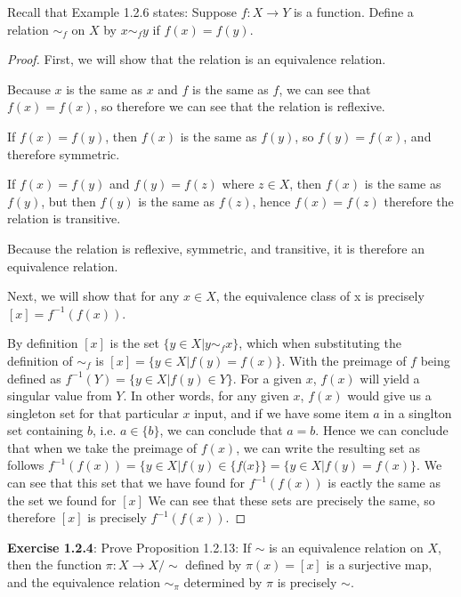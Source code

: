 \documentclass[a4paper]{article}
\begin{document}
\begin{myparindent}{0pt}
Recall that Example 1.2.6 states: Suppose $f : X \rightarrow Y$ is a function.
Define a relation $\sim_f$ on $X$ by $x \sim_f y$ if $f(x) = f(y)$.

\begin{proof}
    First, we will show that the relation is an equivalence relation. \newline

    Because $x$ is the same as $x$ and $f$ is the same as $f$, we can see that
    $f(x) = f(x)$, so therefore we can see that the relation is reflexive. \newline

    If $f(x) = f(y)$, then $f(x)$ is the same as $f(y)$, so $f(y) = f(x)$,
    and therefore symmetric. \newline

    If $f(x) = f(y)$ and $f(y) = f(z)$ where $z \in X$, then $f(x)$ is
    the same as $f(y)$, but then $f(y)$ is the same as $f(z)$, hence $f(x) = f(z)$
    therefore the relation is transitive. \newline

    Because the relation is reflexive, symmetric, and transitive, it
    is therefore an equivalence relation. \newline

    Next, we will show that for any $x \in X$, the equivalence class of x is
    precisely $[x] = f^{-1}(f(x))$. \newline

    By definition $[x]$ is the set $\{y \in X | y \sim_f x\}$, which when substituting
    the definition of $\sim_f$ is $[x] = \{y \in X | f(y) = f(x)\}$. With the preimage
    of $f$ being defined as $f^{-1}(Y) = \{ y \in X | f(y) \in Y \}$.
    For a given $x$, $f(x)$ will yield
    a singular value from $Y$. In other words, for any given $x$, $f(x)$
    would give us a singleton set for that particular $x$ input, and if we have
    some item $a$ in a singlton set containing $b$, i.e. $a \in \{b\}$, we can
    conclude that $a = b$. Hence we can conclude that when we take the preimage
    of $f(x)$, we can write the resulting set as follows
    $f^{-1}(f(x)) = \{ y \in X | f(y) \in \{f(x\} \} = \{ y \in X | f(y) = f(x) \}$. We can see
    that this set that we have found for $f^{-1}(f(x))$ is eactly the same
    as the set we found for $[x]$
    We can see that these sets are precisely the same, so therefore $[x]$ is
    precisely $f^{-1}(f(x))$.
\end{proof}

\textbf{Exercise 1.2.4}:
Prove Proposition 1.2.13: If $\sim$ is an equivalence relation on $X$, then the function $\pi: X \rightarrow X/\sim$
defined by $\pi(x) = [x]$ is a surjective map, and the equivalence relation $\sim_{\pi}$ determined by $\pi$ is
precisely $\sim$. \newline


\end{myparindent}
\end{document}

